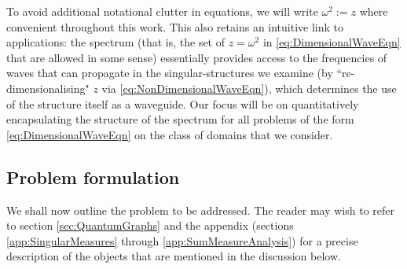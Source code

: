 To avoid additional notational clutter in equations, we will write $\omega^2 := z$ where convenient throughout this work.
This also retains an intuitive link to applications: the spectrum (that is, the set of $z=\omega^2$ in \eqref{eq:DimensionalWaveEqn} that are allowed in some sense) essentially provides access to the frequencies of waves that can propagate in the singular-structures we examine (by ``re-dimensionalising" $z$ via \eqref{eq:NonDimensionalWaveEqn}), which determines the use of the structure itself as a waveguide.
Our focus will be on quantitatively encapsulating the structure of the spectrum for all problems of the form \eqref{eq:DimensionalWaveEqn} on the class of domains that we consider.

\subsection{Problem formulation} \label{ssec:OurSystem}
We shall now outline the problem to be addressed.
The reader may wish to refer to section \ref{sec:QuantumGraphs} and the appendix (sections \ref{app:SingularMeasures} through \ref{app:SumMeasureAnalysis}) for a precise description of the objects that are mentioned in the discussion below. 

